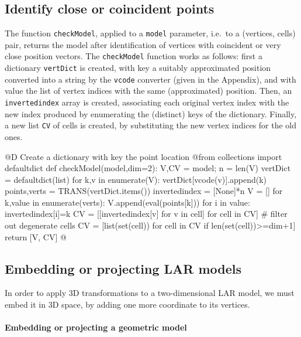 \documentclass[11pt,oneside]{article}	%
\begin{document}
\subsection{Identify close or coincident points}

The function \texttt{checkModel}, applied to a \texttt{model} parameter, i.e.~to a (vertices, cells)  pair, returns the model after identification of vertices with coincident or very close position vectors.
The \texttt{checkModel} function works as follows: first a dictionary \texttt{vertDict} is created, with key a suitably approximated position converted into a string by the \texttt{vcode} converter (given in the Appendix), and with value the list of vertex indices with the same (approximated) position. Then, an \texttt{invertedindex} array is created, associating each original vertex index with the new index produced by enumerating the (distinct) keys of the dictionary. Finally, a new list \texttt{CV} of cells is created, by substituting the new vertex indices for the old ones. 

@D Create a dictionary with key the point location
@{from collections import defaultdict
def checkModel(model,dim=2):
	V,CV = model; n = len(V)
	vertDict = defaultdict(list)
	for k,v in enumerate(V): vertDict[vcode(v)].append(k) 
	points,verts = TRANS(vertDict.items())
	invertedindex = [None]*n
	V = []
	for k,value in enumerate(verts):
		V.append(eval(points[k]))
		for i in value:
			invertedindex[i]=k	
	CV = [[invertedindex[v] for v in cell] for cell in CV]
	# filter out degenerate cells
	CV = [list(set(cell)) for cell in CV if len(set(cell))>=dim+1]
	return [V, CV]
@}

\subsection{Embedding or projecting LAR models}

In order to apply 3D transformations to a two-dimensional LAR model, we must embed it in 3D space, by adding one more coordinate to its vertices. 

\paragraph{Embedding or projecting a geometric model}
\end{document}

